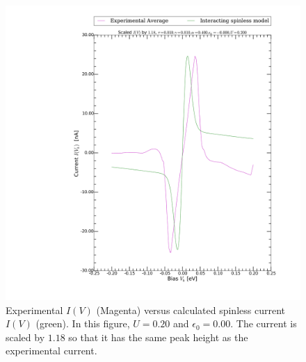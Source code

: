 \begin{figure}[h]
    \centering
    \includegraphics[width=.95\textwidth, clip=true, trim=11cm 2cm 2cm 0cm]{pdf/fit/fit_spinless_0.pdf}
    \caption{Experimental $I(V)$ (Magenta) versus calculated spinless current $I(V)$ (green). In this figure, $U=0.20$ and $\epsilon_0 = 0.00$. The current is scaled by $1.18$ so that it has the same peak height as the experimental current.}
    \label{fig:fitspinless0}
\end{figure}
